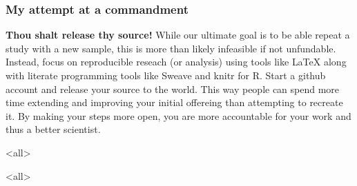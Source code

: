 \documentclass{beamer}
\begin{document}
  
  
  \begin{frame}
    \frametitle{My attempt at a commandment}
    \textbf{Thou shalt release thy source!}
    While our ultimate goal is to be able repeat a study with a new sample, this is more than likely infeasible if not unfundable.
    Instead, focus on reproducible reseach (or analysis) using tools like {\LaTeX} along with literate programming tools like Sweave and knitr for R.
    Start a github account and release your source to the world.
    This way people can spend more time extending and improving your initial offereing than attempting to recreate it.
    By making your steps more open, you are more accountable for your work and thus a better scientist.
  \end{frame}



  \mode<all>
  {
    \begin{frame}[plain]
    \end{frame}
  }
  \mode<all>{\usebackgroundtemplate{}}
  \mode*
\end{document}
